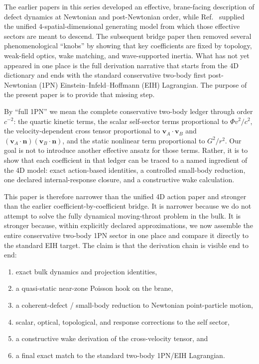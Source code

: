 \documentclass[11pt]{article}
\newcommand{\vct}{\mathbf v}
\newcommand{\nvec}{\mathbf n}
\begin{document}
The earlier papers in this series developed an effective, brane-facing description of defect dynamics at Newtonian and post-Newtonian order, while Ref.~\cite{norris2026_4d_model} supplied the unified \(4\)-spatial-dimensional generating model from which those effective sectors are meant to descend. The subsequent bridge paper then removed several phenomenological ``knobs'' by showing that key coefficients are fixed by topology, weak-field optics, wake matching, and wave-supported inertia. What has not yet appeared in one place is the full derivation narrative that starts from the 4D dictionary and ends with the standard conservative two-body first post-Newtonian (1PN) Einstein--Infeld--Hoffmann (EIH) Lagrangian. The purpose of the present paper is to provide that missing step.

By ``full 1PN'' we mean the complete conservative two-body ledger through order \(c^{-2}\): the quartic kinetic terms, the scalar self-sector terms proportional to \(\Phi v^2/c^2\), the velocity-dependent cross tensor proportional to \(\vct_A\!\cdot\!\vct_B\) and \((\vct_A\!\cdot\!\nvec)(\vct_B\!\cdot\!\nvec)\), and the static nonlinear term proportional to \(G^2/r^2\). Our goal is not to introduce another effective ansatz for those terms. Rather, it is to show that each coefficient in that ledger can be traced to a named ingredient of the 4D model: exact action-based identities, a controlled small-body reduction, one declared internal-response closure, and a constructive wake calculation.

This paper is therefore narrower than the unified 4D action paper and stronger than the earlier coefficient-by-coefficient bridge. It is narrower because we do not attempt to solve the fully dynamical moving-throat problem in the bulk. It is stronger because, within explicitly declared approximations, we now assemble the entire conservative two-body 1PN sector in one place and compare it directly to the standard EIH target. The claim is that the derivation chain is visible end to end:
\begin{enumerate}[leftmargin=1.5em]
  \item exact bulk dynamics and projection identities,
  \item a quasi-static near-zone Poisson hook on the brane,
  \item a coherent-defect / small-body reduction to Newtonian point-particle motion,
  \item scalar, optical, topological, and response corrections to the self sector,
  \item a constructive wake derivation of the cross-velocity tensor, and
  \item a final exact match to the standard two-body 1PN/EIH Lagrangian.
\end{enumerate}
\end{document}
